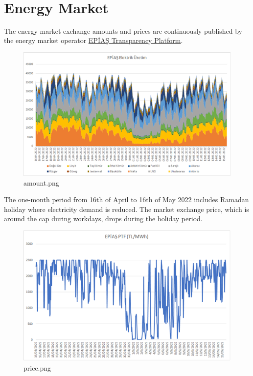 \documentclass[11pt]{article}
\begin{document}
    \begin{center}
    \end{center}
    { \hspace*{\fill} \\}
    
    \hypertarget{energy-market}{%
\section{Energy Market}\label{energy-market}}

The energy market exchange amounts and prices are continuously published
by the energy market operator
\href{https://seffaflik.epias.com.tr/transparency/index.xhtml}{EPİAŞ
Transparency Platform}.

\begin{figure}
\centering
\includegraphics{amount.png}
\caption{amount.png}
\end{figure}

    The one-month period from 16th of April to 16th of May 2022 includes
Ramadan holiday where electricity demand is reduced. The market exchange
price, which is around the cap during workdays, drops during the holiday
period.

\begin{figure}
\centering
\includegraphics{price.png}
\caption{price.png}
\end{figure}
\end{document}

